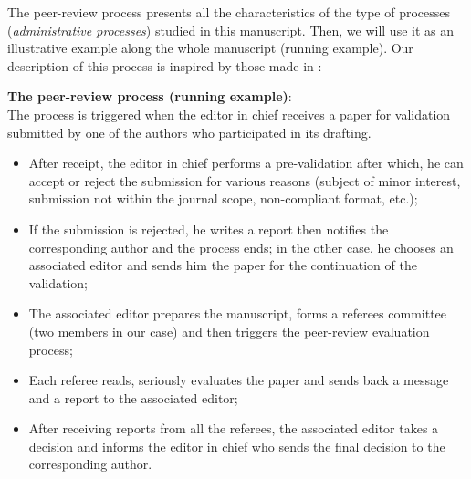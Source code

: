 The peer-review process presents all the characteristics of the type of processes (\textit{administrative processes}) studied in this manuscript. Then, we will use it as an illustrative example along the whole manuscript (running example). Our description of this process is inspired by those made in \cite{peerReview02, van2001proclets, badouel14}: 
\begin{example}
	\textbf{The peer-review process (running example)}:\\
	The process is triggered when the editor in chief receives a paper for validation submitted by one of the authors who participated in its drafting.
	\begin{itemize}
		\item After receipt, the editor in chief performs a pre-validation after which, he can accept or reject the submission for various reasons (subject of minor interest, submission not within the journal scope, non-compliant format, etc.);
		\item If the submission is rejected, he writes a report then notifies the corresponding author and the process ends; in the other case, he chooses an associated editor and sends him the paper for the continuation of the validation; 
		\item The associated editor prepares the manuscript, forms a referees committee (two members in our case) and then triggers the peer-review evaluation process;
		\item Each referee reads, seriously evaluates the paper and sends back a message and a report to the associated editor;
		\item After receiving reports from all the referees, the associated editor takes a decision and informs the editor in chief who sends the final decision to the corresponding author.
	\end{itemize}
\end{example}

